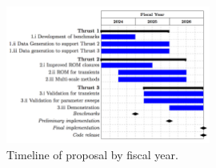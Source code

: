
\begin{figure}[t!] \centering
    \includegraphics[width = 0.60\textwidth]{figs/neup_gantt.png}
    \caption{Timeline of proposal by fiscal year.  \label{fig:gantt}}
\end{figure}


